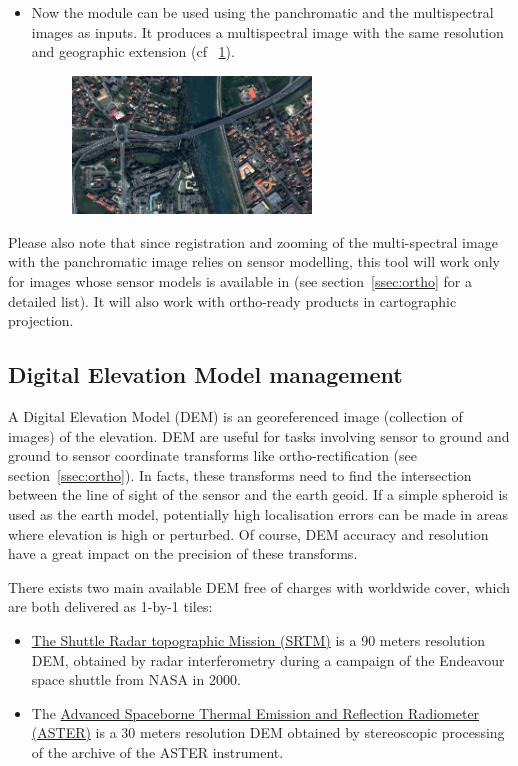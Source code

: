 \begin{itemize}
\item Now the  module can be used using the panchromatic and the multispectral images as inputs. It produces a multispectral image with the same resolution and geographic extension (cf ~\ref{fig:pansharpen}).

\begin{figure}
  \center
  \includegraphics[width=0.6\textwidth]{../Art/MonteverdiImages/monteverdi_QB_XS_pan-sharpened.png}
  \label{fig:pansharpen}
\end{figure}

\end{itemize}


Please also note that since registration and zooming of the
multi-spectral image with the panchromatic image relies on sensor
modelling, this tool will work only for images whose sensor models is
available in \otb (see section~\ref{ssec:ortho} for a detailed
list). It will also work with ortho-ready products in cartographic
projection.

\subsection{Digital Elevation Model management}\label{ssec:dem}

A Digital Elevation Model (DEM) is an georeferenced image (collection
of images) of the elevation. DEM are useful for tasks involving sensor
to ground and ground to sensor coordinate transforms like
ortho-rectification (see section~\ref{ssec:ortho}). In facts, these
transforms need to find the intersection between the line of sight of
the sensor and the earth geoid. If a simple spheroid is used as the
earth model, potentially high localisation errors can be made in areas
where elevation is high or perturbed. Of course, DEM accuracy and
resolution have a great impact on the precision of these transforms.

There exists two main available DEM free of charges with worldwide
cover, which are both delivered as 1-by-1 tiles:
\begin{itemize}
\item \href{http://www2.jpl.nasa.gov/srtm/}{The Shuttle Radar
  topographic Mission (SRTM)} is a 90 meters resolution DEM, obtained
  by radar interferometry during a campaign of the Endeavour space
  shuttle from NASA in 2000.
\item The \href{http://www.ersdac.or.jp/GDEM/E/2.html}{Advanced
  Spaceborne Thermal Emission and Reflection Radiometer (ASTER)} is a
  30 meters resolution DEM obtained by stereoscopic processing of the
  archive of the ASTER instrument.
\end{itemize}

